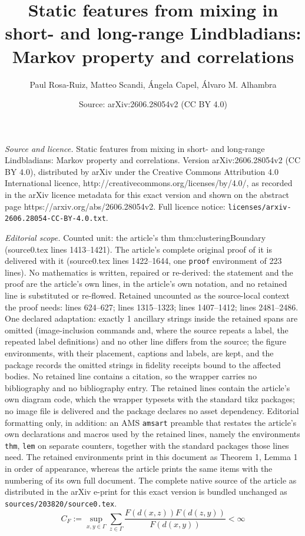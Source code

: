 \documentclass[10pt,a4paper]{amsart}
\title{Static features from mixing in short- and long-range Lindbladians: Markov property and correlations}
\author{Paul Rosa-Ruiz, Matteo Scandi, \'Angela Capel, \'Alvaro M. Alhambra}
\date{Source: arXiv:2606.28054v2 (CC BY 4.0)}
\newcommand{\G}{\Gamma}
\begin{document}
\maketitle

\noindent\emph{Source and licence.} Static features from mixing in short- and long-range Lindbladians: Markov property and correlations. Version arXiv:2606.28054v2 (CC BY 4.0), distributed by arXiv under the Creative Commons Attribution 4.0 International licence, http://creativecommons.org/licenses/by/4.0/, as recorded in the arXiv licence metadata for this exact version and shown on the abstract page https://arxiv.org/abs/2606.28054v2. Full licence notice: \texttt{licenses/arxiv-2606.28054-CC-BY-4.0.txt}.\par\smallskip

\noindent\textit{Editorial scope.} Counted unit: the article's thm thm:clusteringBoundary (source0.tex lines 1413--1421). The article's complete original proof of it is delivered with it (source0.tex lines 1422--1644, one \texttt{proof} environment of 223 lines). No mathematics is written, repaired or re-derived: the statement and the proof are the article's own lines, in the article's own notation, and no retained line is substituted or re-flowed.  Retained uncounted as the source-local context the proof needs: lines 624--627; lines 1315--1323; lines 1407--1412; lines 2481--2486.  One declared adaptation: exactly 1 ancillary strings inside the retained spans are omitted (image-inclusion commands and, where the source repeats a label, the repeated label definitions) and no other line differs from the source; the figure environments, with their placement, captions and labels, are kept, and the package records the omitted strings in fidelity receipts bound to the affected bodies.  No retained line contains a citation, so the wrapper carries no bibliography and no bibliography entry.  The retained lines contain the article's own diagram code, which the wrapper typesets with the standard tikz packages; no image file is delivered and the package declares no asset dependency.  Editorial formatting only, in addition: an AMS \texttt{amsart} preamble that restates the article's own declarations and macros used by the retained lines, namely the environments \texttt{thm}, \texttt{lem} on separate counters, together with the standard packages those lines need.  The retained environments print in this document as Theorem 1, Lemma 1 in order of appearance, whereas the article prints the same items with the numbering of its own full document.  The complete native source of the article as distributed in the arXiv e-print for this exact version is bundled unchanged as \texttt{sources/203820/source0.tex}.
    \begin{equation}
        C_F:=\sup_{x,y\in \G}\sum_{z\in\G}\dfrac{F(d(x,z))F(d(z,y))}{F(d(x,y))}<\infty
        \label{eq:convolutionCF}
    \end{equation}
\end{document}
